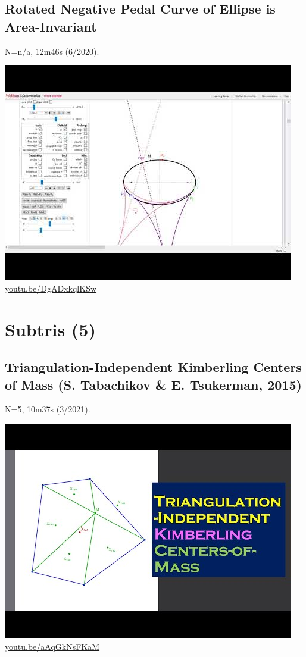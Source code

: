 \documentclass[12pt]{amsart}
\begin{document}
\subsection{Rotated Negative Pedal Curve of Ellipse is Area-Invariant}
\label{vid:DgADxkqlKSw}
\noindent N=n/a, 12m46s (6/2020). 
\begin{center}\includegraphics[width=.5\textwidth]{pics/DgADxkqlKSw.jpg} \\ 
\href{https://youtu.be/DgADxkqlKSw}{\url{youtu.be/DgADxkqlKSw}}\end{center}
% 


\section{Subtris (5)}

\subsection{Triangulation-Independent Kimberling Centers of Mass (S. Tabachikov \& E. Tsukerman, 2015)}
\label{vid:aAqGkNsFKaM}
\noindent N=5, 10m37s (3/2021). 
\begin{center}\includegraphics[width=.5\textwidth]{pics/aAqGkNsFKaM.jpg} \\ 
\href{https://youtu.be/aAqGkNsFKaM}{\url{youtu.be/aAqGkNsFKaM}}\end{center}
% 
\end{document}
